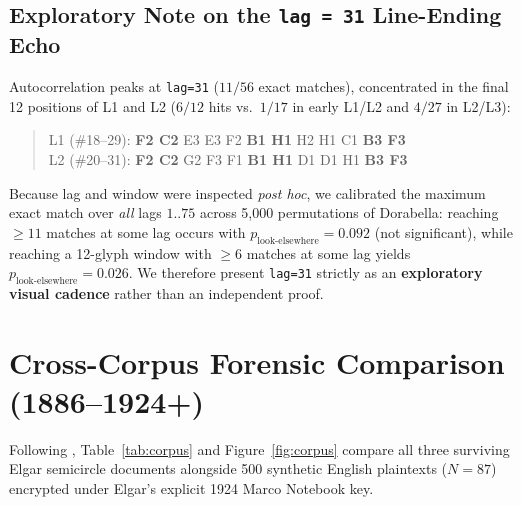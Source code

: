 \documentclass[10pt,a4paper,twocolumn]{article}
\newcommand{\code}[1]{\texttt{\small #1}}
\begin{document}
\subsection{Exploratory Note on the \code{lag = 31} Line-Ending Echo}
Autocorrelation peaks at \code{lag=31} ($11/56$ exact matches), concentrated in the final 12 positions of L1 and L2 ($6/12$ hits vs.\ $1/17$ in early L1/L2 and $4/27$ in L2/L3):
\begin{quote}\scriptsize\ttfamily\noindent
L1 (\#18--29): \textbf{F2 C2} E3 E3 F2 \textbf{B1 H1} H2 H1 C1 \textbf{B3 F3}\\
L2 (\#20--31): \textbf{F2 C2} G2 F3 F1 \textbf{B1 H1} D1 D1 H1 \textbf{B3 F3}
\end{quote}
Because lag and window were inspected \emph{post hoc}, we calibrated the maximum exact match over \emph{all} lags $1..75$ across 5,000 permutations of Dorabella: reaching $\ge 11$ matches at some lag occurs with $p_{\mathrm{look\text{-}elsewhere}} = 0.092$ (not significant), while reaching a 12-glyph window with $\ge 6$ matches at some lag yields $p_{\mathrm{look\text{-}elsewhere}} = 0.026$. We therefore present \code{lag=31} strictly as an \textbf{exploratory visual cadence} rather than an independent proof.

\section{Cross-Corpus Forensic Comparison (1886--1924+)}
\label{sec:corpus}

Following \citet{pelling2019dorabella}, Table~\ref{tab:corpus} and Figure~\ref{fig:corpus} compare all three surviving Elgar semicircle documents alongside 500 synthetic English plaintexts ($N=87$) encrypted under Elgar's explicit 1924 Marco Notebook key.
\end{document}

